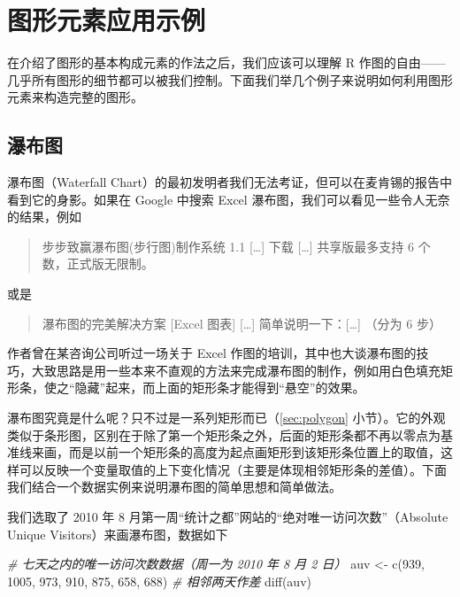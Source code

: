 \documentclass[
  b5paper,
  UTF8,twoside]{book}
\newenvironment{Shaded}{\begin{snugshade}}{\end{snugshade}}
\newcommand{\CommentTok}[1]{\textcolor[rgb]{0.56,0.35,0.01}{\textit{#1}}}
\newcommand{\DecValTok}[1]{\textcolor[rgb]{0.00,0.00,0.81}{#1}}
\newcommand{\FunctionTok}[1]{\textcolor[rgb]{0.00,0.00,0.00}{#1}}
\newcommand{\NormalTok}[1]{#1}
\newcommand{\OtherTok}[1]{\textcolor[rgb]{0.56,0.35,0.01}{#1}}
\begin{document}
\hypertarget{ux56feux5f62ux5143ux7d20ux5e94ux7528ux793aux4f8b}{%
\section{图形元素应用示例}\label{ux56feux5f62ux5143ux7d20ux5e94ux7528ux793aux4f8b}}

在介绍了图形的基本构成元素的作法之后，我们应该可以理解 R 作图的自由------几乎所有图形的细节都可以被我们控制。下面我们举几个例子来说明如何利用图形元素来构造完整的图形。

\hypertarget{subsec:waterfall-chart}{%
\subsection{瀑布图}\label{subsec:waterfall-chart}}

瀑布图（Waterfall Chart）的最初发明者我们无法考证，但可以在麦肯锡的报告中看到它的身影。如果在 Google 中搜索 Excel 瀑布图，我们可以看见一些令人无奈的结果，例如

\begin{quote}
步步致赢瀑布图(步行图)制作系统 1.1 {[}\ldots{]} 下载 {[}\ldots{]} 共享版最多支持 6 个数，正式版无限制。
\end{quote}

或是

\begin{quote}
瀑布图的完美解决方案 {[}Excel 图表{]} {[}\ldots{]} 简单说明一下：{[}\ldots{]} （分为 6 步）
\end{quote}

作者曾在某咨询公司听过一场关于 Excel 作图的培训，其中也大谈瀑布图的技巧，大致思路是用一些本来不直观的方法来完成瀑布图的制作，例如用白色填充矩形条，使之``隐藏''起来，而上面的矩形条才能得到``悬空''的效果。

瀑布图究竟是什么呢？只不过是一系列矩形而已（\ref{sec:polygon} 小节）。它的外观类似于条形图，区别在于除了第一个矩形条之外，后面的矩形条都不再以零点为基准线来画，而是以前一个矩形条的高度为起点画矩形到该矩形条位置上的取值，这样可以反映一个变量取值的上下变化情况（主要是体现相邻矩形条的差值）。下面我们结合一个数据实例来说明瀑布图的简单思想和简单做法。

我们选取了 2010 年 8 月第一周``统计之都''网站的``绝对唯一访问次数''（Absolute Unique Visitors）来画瀑布图，数据如下

\begin{Shaded}
\begin{Highlighting}[]
\CommentTok{\# 七天之内的唯一访问次数数据（周一为 2010 年 8 月 2 日）}
\NormalTok{auv }\OtherTok{\textless{}{-}} \FunctionTok{c}\NormalTok{(}\DecValTok{939}\NormalTok{, }\DecValTok{1005}\NormalTok{, }\DecValTok{973}\NormalTok{, }\DecValTok{910}\NormalTok{, }\DecValTok{875}\NormalTok{, }\DecValTok{658}\NormalTok{, }\DecValTok{688}\NormalTok{)}
\CommentTok{\# 相邻两天作差}
\FunctionTok{diff}\NormalTok{(auv)}
\end{Highlighting}
\end{Shaded}
\end{document}
